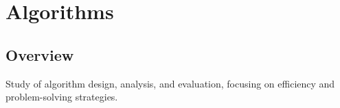 \chapter{Algorithms}

\section*{Overview}
Study of algorithm design, analysis, and evaluation, focusing on efficiency and problem-solving strategies.

